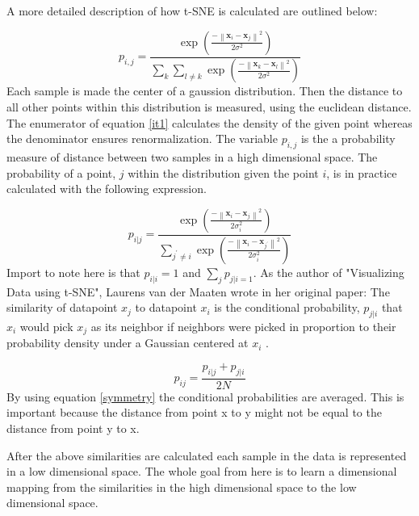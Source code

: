 \documentclass[12pt, fleqn, titlepage]{article}
\newcommand{\norm}[1]{\left\lVert#1\right\rVert}
\newcommand{\1}[1]{\mathds{1}\left[#1\right]}
\begin{document}
A more detailed description of how t-SNE is calculated are outlined below:

\begin{equation}\label{it1}
		p_{i,j} = \frac{\exp(\frac{-\norm{\mathbf x_i - \mathbf x_j}^2}{2 \sigma^2})}{\sum_{k} \sum_{l \neq k} \exp (\frac{-\norm{\mathbf x_k - \mathbf x_l}^2}{2 \sigma^2})}
\end{equation}
Each sample is made the center of a gaussion distribution. Then the distance to all other points within this distribution is measured, using the euclidean distance. The enumerator of equation \eqref{it1} calculates the density of the given point whereas the denominator ensures renormalization. The variable $ p_{i,j} $ is the a probability measure of distance between two samples in a high dimensional space. The probability of a point, $ j $ within the distribution given the point $ i $, is in practice calculated with the following expression.

\begin{equation*}\label{key}
	p_{i \vert j} = \frac{\exp(\frac{-\norm{\mathbf x_i - \mathbf x_j}^2}{2 \sigma_i^2})}{\sum_{j^\prime \neq i} \exp (\frac{-\norm{\mathbf x_i - \mathbf x_{j^\prime}}^2}{2 \sigma_i^2})}
\end{equation*}
\noindent
Import to note here is that $ p_{i \vert i} = 1$  and $ \sum_{j} p_{j \vert i = 1}$. As the author of "Visualizing Data using t-SNE", Laurens van der Maaten  wrote in her original paper: The similarity of datapoint $ x_j $ to datapoint $ x_i $ is the conditional probability, $ p_{j \vert i} $  that $ x_i $ would pick $ x_j $ as its neighbor if neighbors were picked in proportion to their probability density under a Gaussian centered at $  x_i $ \cite{tsne}.

\begin{equation}\label{symmetry}
	p_{ij} = \frac{	p_{i \vert j} + p_{j \vert i}}{2N}
\end{equation}
\noindent
By using equation \eqref{symmetry} the conditional probabilities are averaged. This is important because the distance from point x to y might not be equal to the distance from point y to x. 

After the above similarities are calculated each sample in the data is represented in a low dimensional space. The whole goal from here is to learn a dimensional mapping from the similarities in the high dimensional space to the low dimensional space.
\end{document}
